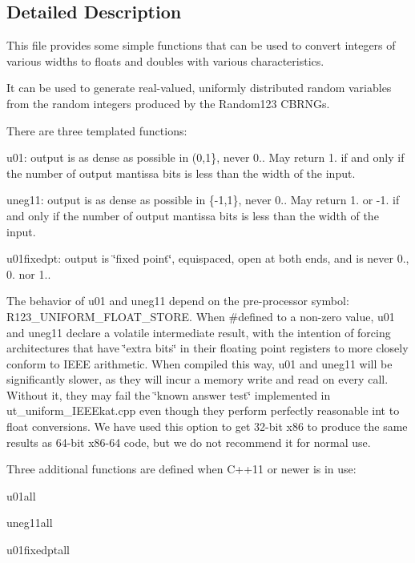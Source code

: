 \subsection{Detailed Description}
This file provides some simple functions that can be used to convert integers of various widths to floats and doubles with various characteristics. 

It can be used to generate real-\/valued, uniformly distributed random variables from the random integers produced by the Random123 C\+B\+R\+N\+Gs.

There are three templated functions\+:


\begin{DoxyItemize}
\item u01\+: output is as dense as possible in (0,1\}, never 0.. May return 1. if and only if the number of output mantissa bits is less than the width of the input.
\item uneg11\+: output is as dense as possible in \{-\/1,1\}, never 0.. May return 1. or -\/1. if and only if the number of output mantissa bits is less than the width of the input.
\item u01fixedpt\+: output is \char`\"{}fixed point\char`\"{}, equispaced, open at both ends, and is never 0., 0. nor 1..
\end{DoxyItemize}

The behavior of u01 and uneg11 depend on the pre-\/processor symbol\+: R123\+\_\+\+U\+N\+I\+F\+O\+R\+M\+\_\+\+F\+L\+O\+A\+T\+\_\+\+S\+T\+O\+RE. When \#defined to a non-\/zero value, u01 and uneg11 declare a volatile intermediate result, with the intention of forcing architectures that have \char`\"{}extra bits\char`\"{} in their floating point registers to more closely conform to I\+E\+EE arithmetic. When compiled this way, u01 and uneg11 will be significantly slower, as they will incur a memory write and read on every call. Without it, they may fail the \char`\"{}known answer test\char`\"{} implemented in ut\+\_\+uniform\+\_\+\+I\+E\+E\+Ekat.\+cpp even though they perform perfectly reasonable int to float conversions. We have used this option to get 32-\/bit x86 to produce the same results as 64-\/bit x86-\/64 code, but we do not recommend it for normal use.

Three additional functions are defined when C++11 or newer is in use\+:


\begin{DoxyItemize}
\item u01all
\item uneg11all
\item u01fixedptall
\end{DoxyItemize}

